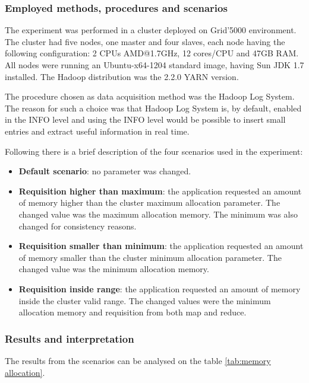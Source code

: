 \subsubsection{Employed methods, procedures and scenarios}
The experiment was performed in a cluster deployed on Grid'5000 environment. The cluster had five nodes, one master and four slaves, each node having the following configuration: 2 CPUs AMD@1.7GHz, 12 cores/CPU and 47GB RAM. All nodes were running an Ubuntu-x64-1204 standard image, having Sun JDK 1.7 installed. The Hadoop distribution was the 2.2.0 YARN version.

The procedure chosen as data acquisition method was the Hadoop Log System. The reason for such a choice was that Hadoop Log System is, by default, enabled in the INFO level and using the INFO level would be possible to insert small entries and extract useful information in real time.

Following there is a brief description of the four scenarios used in the experiment:

\begin{itemize}
	\item \textbf{Default scenario}: no parameter was changed.
	\item \textbf{Requisition higher than maximum}: the application requested an amount of memory higher than the cluster maximum allocation parameter. The changed value was the maximum allocation memory. The minimum was also changed for consistency reasons.
	\item \textbf{Requisition smaller than minimum}: the application requested an amount of memory smaller than the cluster minimum allocation parameter. The changed value was the minimum allocation memory.
	\item \textbf{Requisition inside range}: the application requested an amount of memory inside the cluster valid range. The changed values were the minimum allocation memory and requisition from both map and reduce.
\end{itemize}

\subsubsection{Results and interpretation}

The results from the scenarios can be analysed on the table \ref{tab:memory allocation}.

